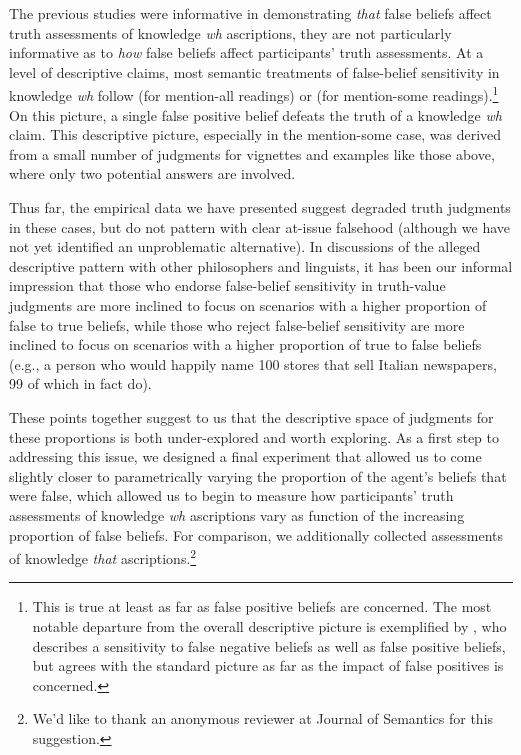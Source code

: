 \documentclass[a4paper]{article}
\begin{document}
The previous studies were informative in demonstrating \textit{that} false beliefs affect truth assessments of knowledge \textit{wh} ascriptions, they are not particularly informative as to \textit{how} false beliefs affect participants' truth assessments. At a level of descriptive claims, most semantic treatments of false-belief sensitivity in knowledge \textit{wh} follow \citet{spector:05} (for mention-all readings) or \citet{george:dis} (for mention-some readings).\footnote{This is true at least as far as false positive beliefs are concerned. The most notable departure from the overall descriptive picture is exemplified by \citet{xiang:sub:16}, who describes a sensitivity to false negative beliefs as well as false positive beliefs, but agrees with the standard picture as far as the impact of false positives is concerned.} On this picture, a single false positive belief defeats the truth of a knowledge \textit{wh} claim. This descriptive picture, especially in the mention-some case, was derived from a small number of judgments for vignettes and examples like those above, where only two potential answers are involved. 

Thus far, the empirical data we have presented suggest degraded truth judgments in these cases, but do not pattern with clear at-issue falsehood (although we have not yet identified an unproblematic alternative). In discussions of the alleged descriptive pattern with other philosophers and linguists, it has been our informal impression that those who endorse false-belief sensitivity in truth-value judgments are more inclined to focus on scenarios with a higher proportion of false to true beliefs, while those who reject false-belief sensitivity are more inclined to focus on scenarios with a higher proportion of true to false beliefs (e.g., a person who would happily name 100 stores that sell Italian newspapers, 99 of which in fact do).

These points together suggest to us that the descriptive space of judgments for these proportions is both under-explored and worth exploring. As a first step to addressing this issue, we designed a final experiment that allowed us to come slightly closer to parametrically varying the proportion of the agent's beliefs that were false, which allowed us to begin to measure how participants' truth assessments of knowledge \textit{wh} ascriptions vary as function of the increasing proportion of false beliefs. For comparison, we additionally collected assessments of knowledge \textit{that} ascriptions.\footnote{We'd like to thank an anonymous reviewer at Journal of Semantics for this suggestion.} 
\end{document}
